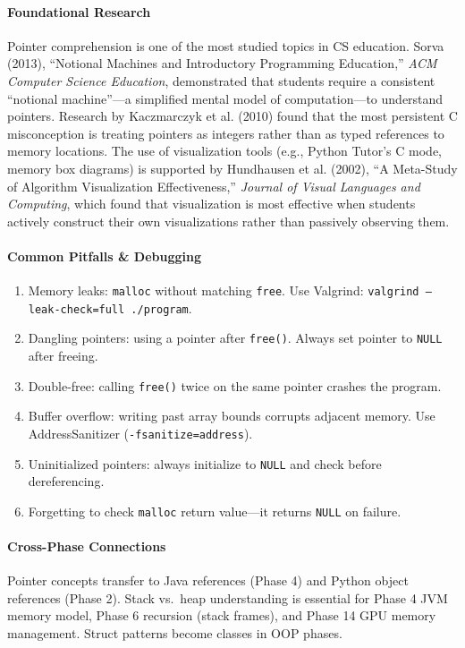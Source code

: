 \documentclass[11pt, a4paper, oneside]{report}
\begin{document}
\paragraph{Foundational Research} Pointer comprehension is one of the most studied topics in CS education. Sorva (2013), ``Notional Machines and Introductory Programming Education,'' \emph{ACM Computer Science Education}, demonstrated that students require a consistent ``notional machine''---a simplified mental model of computation---to understand pointers. Research by Kaczmarczyk et al. (2010) found that the most persistent C misconception is treating pointers as integers rather than as typed references to memory locations. The use of visualization tools (e.g., Python Tutor's C mode, memory box diagrams) is supported by Hundhausen et al. (2002), ``A Meta-Study of Algorithm Visualization Effectiveness,'' \emph{Journal of Visual Languages and Computing}, which found that visualization is most effective when students actively construct their own visualizations rather than passively observing them.


\paragraph{Common Pitfalls \& Debugging}
\begin{enumerate}[leftmargin=*]
\item Memory leaks: \texttt{malloc} without matching \texttt{free}. Use Valgrind: \texttt{valgrind --leak-check=full ./program}.
\item Dangling pointers: using a pointer after \texttt{free()}. Always set pointer to \texttt{NULL} after freeing.
\item Double-free: calling \texttt{free()} twice on the same pointer crashes the program.
\item Buffer overflow: writing past array bounds corrupts adjacent memory. Use AddressSanitizer (\texttt{-fsanitize=address}).
\item Uninitialized pointers: always initialize to \texttt{NULL} and check before dereferencing.
\item Forgetting to check \texttt{malloc} return value---it returns \texttt{NULL} on failure.
\end{enumerate}

\paragraph{Cross-Phase Connections} Pointer concepts transfer to Java references (Phase 4) and Python object references (Phase 2). Stack vs.\ heap understanding is essential for Phase 4 JVM memory model, Phase 6 recursion (stack frames), and Phase 14 GPU memory management. Struct patterns become classes in OOP phases.
\end{document}
